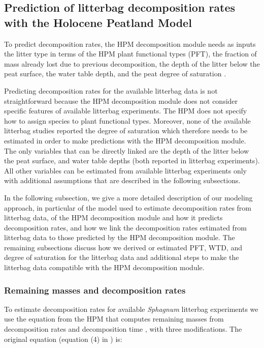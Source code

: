 \documentclass[esd, manuscript]{copernicus}
\begin{document}
\hypertarget{sdm-003-methods-2}{%
\subsection{Prediction of litterbag decomposition rates with the Holocene Peatland Model}\label{sdm-003-methods-2}}

To predict decomposition rates, the HPM decomposition module needs as inputs the litter type in terms of the HPM plant functional types (PFT), the fraction of mass already lost due to previous decomposition, the depth of the litter below the peat surface, the water table depth, and the peat degree of saturation \citep{Frolking.2010}.

Predicting decomposition rates for the available litterbag data is not straightforward because the HPM decomposition module does not consider specific features of available litterbag experiments. The HPM does not specify how to assign species to plant functional types. Moreover, none of the available litterbag studies reported the degree of saturation which therefore needs to be estimated in order to make predictions with the HPM decomposition module. The only variables that can be directly linked are the depth of the litter below the peat surface, and water table depths (both reported in litterbag experiments). All other variables can be estimated from available litterbag experiments only with additional assumptions that are described in the following subsections.

In the following subsection, we give a more detailed description of our modeling approach, in particular of the model used to estimate decomposition rates from litterbag data, of the HPM decomposition module and how it predicts decomposition rates, and how we link the decomposition rates estimated from litterbag data to those predicted by the HPM decomposition module. The remaining subsections discuss how we derived or estimated PFT, WTD, and degree of saturation for the litterbag data and additional steps to make the litterbag data compatible with the HPM decomposition module.

\hypertarget{sdm-003-methods-3}{%
\subsubsection{Remaining masses and decomposition rates}\label{sdm-003-methods-3}}

To estimate decomposition rates for available \emph{Sphagnum} litterbag experiments we use the equation from the HPM that computes remaining masses from decomposition rates and decomposition time \citep{Frolking.2001, Frolking.2010}, with three modifications. The original equation (equation (4) in \citet{Frolking.2001}) is:
\end{document}
